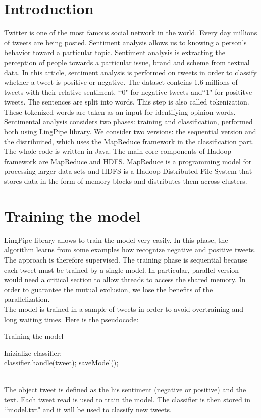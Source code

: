 \documentclass[10pt,twocolumn,letterpaper]{article}
\begin{document}
\section{Introduction}
Twitter is one of the most famous social network in the world. Every day millions of tweets are being posted. Sentiment analysis allows us to knowing a person’s behavior toward a particular topic.
Sentiment analysis is extracting the perception of people towards a particular issue, brand and scheme from textual data.
In this article, sentiment analysis is performed on tweets in order to classify whether a tweet is positive or negative. The dataset conteins 1.6 millions of tweets with their relative sentiment, \lq \lq 0" for negative tweets and\lq \lq1" for posititve tweets. The sentences are split into words. This step is also called tokenization. These tokenized words are taken as an input for identifying opinion words.\\
Sentimental analysis considers two phases: training and classification, performed both using LingPipe library. We consider two versions: the sequential version and the distribuited, which uses the MapReduce framework in the classification part. The whole code is written in Java.
The main core components of Hadoop framework are MapReduce and HDFS. MapReduce is a programming model for processing larger data sets and HDFS is a Hadoop Distributed File System that stores data in the form of memory blocks and distributes them across clusters.


\section{Training the model}
LingPipe library allows to train the model very easily. In this phase, the algorithm learns from some examples how recognize negative and positive tweets. The approach is therefore supervised. The training phase is sequential because each tweet must be trained by a single model. In particular, parallel version would need a critical section to allow threads to access the shared memory. In order to guarantee the mutual exclusion, we lose the benefits of the parallelization.
\\The model is trained in a sample of tweets in order to avoid overtraining and long waiting times. Here is the pseudocode:\\
\begin{algorithm}
\label{Training the model}
\caption{Training the model}
\begin{algorithmic}
	\State Inizialize classifier;
    		 \do \\
			\State classifier.handle(tweet);
		\EndFor
    		\State saveModel();   	
\end{algorithmic}
\end{algorithm} 
\\
The object tweet is defined as the his sentiment (negative or positive) and the text. Each tweet read is used to train the model. The classifier is then stored in \lq\lq model.txt" and it will be used to classify new tweets.
\end{document}
